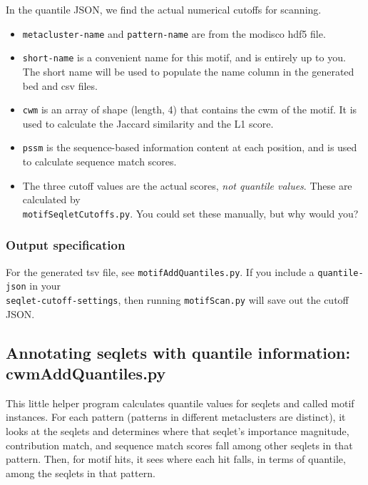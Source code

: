 \documentclass{article}
\begin{document}
In the quantile JSON, we find the actual numerical cutoffs for scanning.

\begin{itemize}
    \item \texttt{metacluster-name} and \texttt{pattern-name} are from the modisco hdf5 file.
    \item \texttt{short-name} is a convenient name for this motif, and is entirely up to you.
        The short name will be used to populate the name column in the generated bed and csv files.
    \item \texttt{cwm} is an array of shape (length, 4) that contains the cwm of the motif.
        It is used to calculate the Jaccard similarity and the L1 score.
    \item \texttt{pssm} is the sequence-based information content at each position, and is
        used to calculate sequence match scores.
    \item The three cutoff values are the actual scores, \emph{not quantile values}.
        These are calculated by \\ \texttt{motifSeqletCutoffs.py}. You could set these
        manually, but why would you?
\end{itemize}

\subsubsection{Output specification}
For the generated tsv file, see \texttt{motifAddQuantiles.py}.
If you include a \texttt{quantile-json} in your \\ \texttt{seqlet-cutoff-settings}, then
running \texttt{motifScan.py} will save out the cutoff JSON.


\newpage


\subsection{Annotating seqlets with quantile information: {cwmAddQuantiles.py}}

This little helper program calculates quantile values for seqlets and called motif instances.
For each pattern (patterns in different metaclusters are distinct), it looks at the seqlets
and determines where that seqlet's importance magnitude, contribution match, and sequence match
scores fall among other seqlets in that pattern.
Then, for motif hits, it sees where each hit falls, in terms of quantile, among the seqlets
in that pattern.
\end{document}
